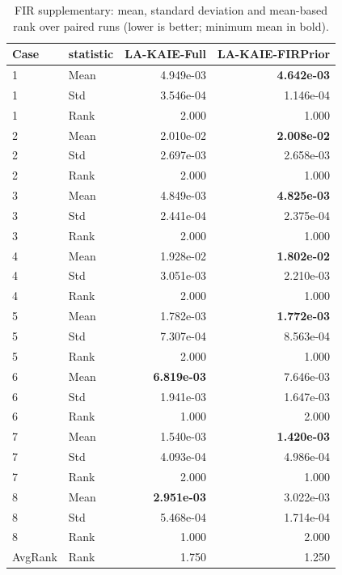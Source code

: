 \begin{table}[t]
\centering
\scriptsize
\caption{FIR supplementary: mean, standard deviation and mean-based rank over paired runs (lower is better; minimum mean in bold).}
\label{tab:fir_supplementary}
\begin{tabular}{llrr}
\hline
Case & statistic & LA-KAIE-Full & LA-KAIE-FIRPrior \\
\hline
1 & Mean & 4.949e-03 & \textbf{4.642e-03} \\
1 & Std & 3.546e-04 & 1.146e-04 \\
1 & Rank & 2.000 & 1.000 \\
2 & Mean & 2.010e-02 & \textbf{2.008e-02} \\
2 & Std & 2.697e-03 & 2.658e-03 \\
2 & Rank & 2.000 & 1.000 \\
3 & Mean & 4.849e-03 & \textbf{4.825e-03} \\
3 & Std & 2.441e-04 & 2.375e-04 \\
3 & Rank & 2.000 & 1.000 \\
4 & Mean & 1.928e-02 & \textbf{1.802e-02} \\
4 & Std & 3.051e-03 & 2.210e-03 \\
4 & Rank & 2.000 & 1.000 \\
5 & Mean & 1.782e-03 & \textbf{1.772e-03} \\
5 & Std & 7.307e-04 & 8.563e-04 \\
5 & Rank & 2.000 & 1.000 \\
6 & Mean & \textbf{6.819e-03} & 7.646e-03 \\
6 & Std & 1.941e-03 & 1.647e-03 \\
6 & Rank & 1.000 & 2.000 \\
7 & Mean & 1.540e-03 & \textbf{1.420e-03} \\
7 & Std & 4.093e-04 & 4.986e-04 \\
7 & Rank & 2.000 & 1.000 \\
8 & Mean & \textbf{2.951e-03} & 3.022e-03 \\
8 & Std & 5.468e-04 & 1.714e-04 \\
8 & Rank & 1.000 & 2.000 \\
AvgRank & Rank & 1.750 & 1.250 \\
\hline
\end{tabular}
\end{table}
